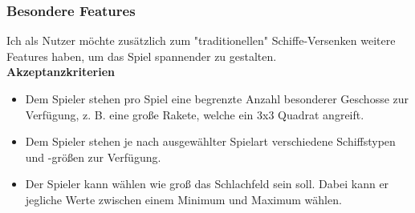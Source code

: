 \documentclass[conference]{IEEEtran}
\begin{document}
    \subsubsection{Besondere Features }
    Ich als Nutzer möchte zusätzlich zum "traditionellen" Schiffe-Versenken weitere Features haben, um das Spiel spannender zu gestalten. \\
    \textbf{Akzeptanzkriterien}
    \begin{itemize}
        \item Dem Spieler stehen pro Spiel eine begrenzte Anzahl besonderer Geschosse zur Verfügung, z. B. eine große Rakete, welche ein 3x3 Quadrat angreift. 
        \item Dem Spieler stehen je nach ausgewählter Spielart verschiedene Schiffstypen und -größen zur Verfügung. 
        \item Der Spieler kann wählen wie groß das Schlachfeld sein soll. Dabei kann er jegliche Werte zwischen einem Minimum und Maximum wählen.
    \end{itemize}
    \ \\

\end{document}
